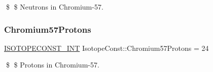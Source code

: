 \$ \$ Neutrons in Chromium-\/57. \mbox{\label{group___isotope_const-_chromium-_cr57_gadda9fd6f02dfc46340f8f8b3a61bbcaa}} 
\subsubsection{\texorpdfstring{Chromium57\+Protons}{Chromium57Protons}}
{\footnotesize\ttfamily \mbox{\hyperlink{group___isotope_const-_macros_ga5f18360b3e99483a35c32d789e62621c}{I\+S\+O\+T\+O\+P\+E\+C\+O\+N\+S\+T\+\_\+\+I\+NT}} Isotope\+Const\+::\+Chromium57\+Protons = 24}

\$ \$ Protons in Chromium-\/57. 